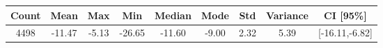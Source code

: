 \begin{tabular}{|c|c|c|c|c|c|c|c|c|}\hline
\rowcolor{Plum!20}
Count&Mean&Max&Min&Median&Mode&Std&Variance&CI [95\%]\\\hline\hline
4498&-11.47&-5.13&-26.65&-11.60&-9.00&2.32&5.39&[-16.11,-6.82]\\\hline
\end{tabular}
